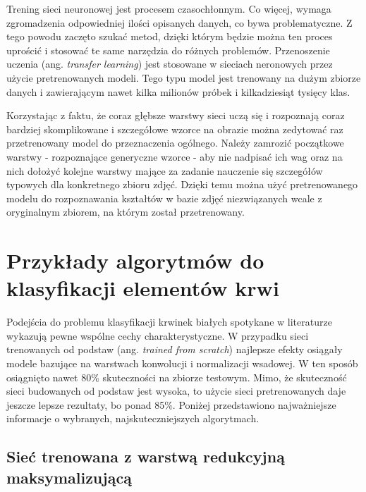Trening sieci neuronowej jest procesem czasochłonnym. Co więcej, wymaga zgromadzenia odpowiedniej ilości opisanych danych, co bywa problematyczne. Z tego powodu zaczęto szukać metod, dzięki którym będzie można ten proces uprościć i stosować te same narzędzia do różnych problemów. Przenoszenie uczenia (ang. \textit{transfer learning}) jest stosowane w sieciach neronowych przez użycie pretrenowanych modeli. Tego typu model jest trenowany na dużym zbiorze danych i zawierającym nawet kilka milionów próbek i kilkadziesiąt tysięcy klas. 

{\parindent0pt %
Korzystając z faktu, że coraz głębsze warstwy sieci uczą się i rozpoznają coraz bardziej skomplikowane i szczegółowe wzorce na obrazie można zedytować raz przetrenowany model do przeznaczenia ogólnego. Należy zamrozić początkowe warstwy - rozpoznające generyczne wzorce - aby nie nadpisać ich wag oraz na nich dołożyć kolejne warstwy mające za zadanie nauczenie się szczegółów typowych dla konkretnego zbioru zdjęć. Dzięki temu można użyć pretrenowanego modelu do rozpoznawania kształtów w bazie zdjęć niezwiązanych wcale z oryginalnym zbiorem, na którym został przetrenowany. 
}

\section{Przykłady algorytmów do klasyfikacji elementów krwi}

Podejścia do problemu klasyfikacji krwinek białych spotykane w literaturze wykazują pewne wspólne cechy charakterystyczne. W przypadku sieci trenowanych od podstaw (ang. \textit{trained from scratch}) najlepsze efekty osiągały modele bazujące na warstwach konwolucji i normalizacji wsadowej. W ten sposób osiągnięto nawet 80\% skuteczności na zbiorze testowym. Mimo, że skuteczność sieci budowanych od podstaw jest wysoka, to użycie sieci pretrenowanych daje jeszcze lepsze rezultaty, bo ponad 85\%. Poniżej przedstawiono najważniejsze informacje o wybranych, najskuteczniejszych algorytmach.

\subsection{Sieć trenowana z warstwą redukcyjną maksymalizującą}
\label{sec:section_kaggle_1}

